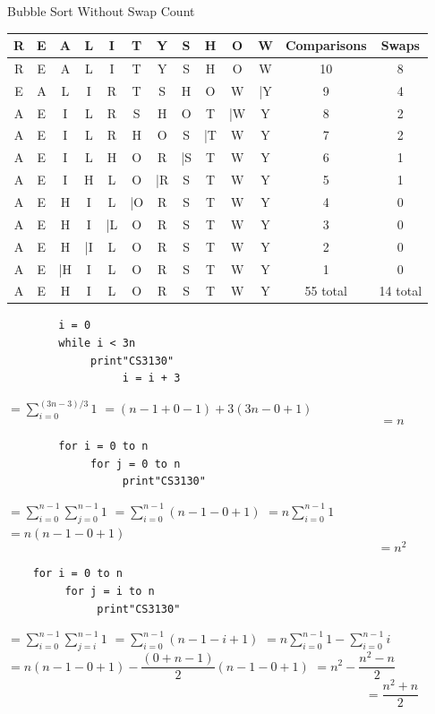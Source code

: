 \documentclass[12pt,largemargins]{homework}
\begin{document}
\begin{alphaparts}
		\item
	Bubble Sort Without Swap Count
		\begin{center}
		\begin{tabular}{c c c c c c c c c c c c c }
		\hline
		R & E & A & L & I & T & Y & S & H & O & W & Comparisons & Swaps\\
		\hline
		R & E & A & L & I & T & Y & S & H & O & W & 10 & 8\\
		\hline
		E & A & L & I & R & T & S & H & O & W & |Y & 9 &4\\
		\hline
		A & E & I & L & R & S & H & O & T & |W & Y & 8 & 2\\
		\hline
		A & E  & I & L & R & H & O & S & |T & W & Y & 7 & 2\\
		\hline
		A & E & I & L & H & O & R & |S & T & W & Y & 6 & 1\\
		\hline
		A & E & I & H & L & O & |R & S & T & W & Y & 5 & 1\\
		\hline
		A & E & H & I & L & |O & R & S & T & W & Y & 4 & 0\\
		\hline
		A & E & H & I & |L & O & R & S & T & W & Y & 3 & 0\\
		\hline
		A & E & H & |I & L & O & R & S & T & W & Y & 2 & 0\\
		\hline
		A & E & |H & I & L & O & R & S & T & W & Y & 1 & 0\\
		\hline
		A & E & H & I & L & O & R & S & T & W & Y & 55 total & 14 total \\
		\end{tabular}
	\end{center}
	\end{alphaparts}
	
\question
	\begin{alphaparts}
	\item
	\begin{verbatim}
		i = 0
		while i < 3n
		     print"CS3130"
		          i = i + 3
	\end{verbatim}
		$=\sum_{i=0}^{(3n-3)/3} 1$
		$=(n-1+0-1) + 3(3n-0+1)$ \large{$$=n$$}
	\item
		\begin{verbatim}
		for i = 0 to n
		     for j = 0 to n 
		          print"CS3130"
		\end{verbatim}
		$=\sum_{i=0}^{n-1} \sum_{j=0}^{n-1} 1$
		$=\sum_{i=0}^{n-1} (n-1-0+1)$
		$=n\sum_{i=0}^{n-1} 1 $\\
		$=n(n-1-0+1)$
		$$=n^2$$

\newpage
	\item
	\begin{verbatim}
	for i = 0 to n 
	     for j = i to n
	          print"CS3130"
	\end{verbatim}
	$=\sum_{i=0}^{n-1} \sum_{j=i}^{n-1} 1$
	$=\sum_{i=0}^{n-1} (n-1-i+1)$
	$=n\sum_{i=0}^{n-1} 1 - \sum_{i=0}^{n-1} i$\\
	$=n(n-1-0+1) - \dfrac{(0 + n-1)}{2} (n -1- 0+1)$
	$=n^2 - \dfrac{n^2 - n}{2}$ \\
	$$=\dfrac{n^2 + n}{2}$$

	\end{alphaparts}
	
\end{document}
